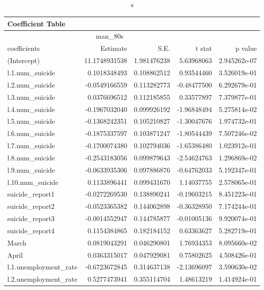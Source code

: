 \begin{longtable}{lrrrr}
\caption*{
{\large Coefficient Table}
} \\ 
\toprule
\multicolumn{4}{c}{man\_80s} &  \\ 
\cmidrule(lr){1-4}
coefficients & Estimate & S.E. & t stat & p value \\ 
\midrule\addlinespace[2.5pt]
(Intercept) & 11.1748931538 & 1.981476238 & 5.63968063 & 2.945262e-07 \\ 
l.1.num\_suicide & 0.1018348493 & 0.108862512 & 0.93544460 & 3.526019e-01 \\ 
l.2.num\_suicide & -0.0549166559 & 0.113282773 & -0.48477500 & 6.292679e-01 \\ 
l.3.num\_suicide & 0.0376696512 & 0.112185855 & 0.33577897 & 7.379877e-01 \\ 
l.4.num\_suicide & -0.1967032040 & 0.099926192 & -1.96848494 & 5.275814e-02 \\ 
l.5.num\_suicide & -0.1368242351 & 0.105210827 & -1.30047676 & 1.974732e-01 \\ 
l.6.num\_suicide & -0.1875337597 & 0.103871247 & -1.80544439 & 7.507246e-02 \\ 
l.7.num\_suicide & -0.1700074380 & 0.102794036 & -1.65386480 & 1.023912e-01 \\ 
l.8.num\_suicide & -0.2543183056 & 0.099879643 & -2.54624763 & 1.296869e-02 \\ 
l.9.num\_suicide & -0.0633935306 & 0.097886876 & -0.64762033 & 5.192347e-01 \\ 
l.10.num\_suicide & 0.1133896441 & 0.099431670 & 1.14037755 & 2.578065e-01 \\ 
suicide\_report1 & -0.0272269530 & 0.138890241 & -0.19603215 & 8.451223e-01 \\ 
suicide\_report2 & -0.0523365382 & 0.144062898 & -0.36328950 & 7.174244e-01 \\ 
suicide\_report3 & -0.0014552947 & 0.144785877 & -0.01005136 & 9.920074e-01 \\ 
suicide\_report4 & 0.1154384865 & 0.182184152 & 0.63363627 & 5.282719e-01 \\ 
March & 0.0819043291 & 0.046290801 & 1.76934353 & 8.095660e-02 \\ 
April & 0.0363315017 & 0.047929081 & 0.75802625 & 4.508426e-01 \\ 
l.1.unemployment\_rate & -0.6723672845 & 0.314637138 & -2.13696097 & 3.590630e-02 \\ 
l.2.unemployment\_rate & 0.5277473941 & 0.355114704 & 1.48613219 & 1.414924e-01 \\ 

\end{longtable}
